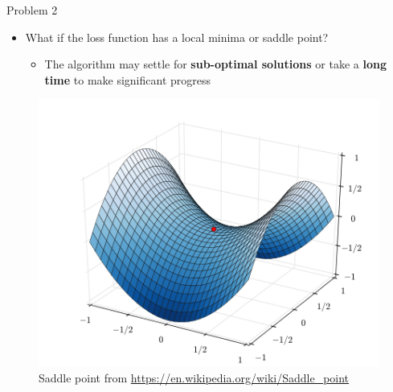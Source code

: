 \documentclass[serif, aspectratio=169]{beamer}
\begin{document}
\begin{frame}{Problem 2}
    \begin{minipage}{0.4\textwidth}
        \begin{itemize}
        \item What if the loss function has a local minima or saddle point?
        \begin{itemize}
            \item The algorithm may settle for \textbf{sub-optimal solutions} or take a \textbf{long time} to make significant progress
        \end{itemize}
        \end{itemize}
    \end{minipage}%
    \begin{minipage}{0.6\textwidth}
        \centering
        \begin{center}
        \begin{figure}
        \centering
            \includegraphics[width=0.75\linewidth]{pic/saddle_wiki.png}
            \caption{\footnotesize Saddle point from \url{https://en.wikipedia.org/wiki/Saddle_point}}
        \end{figure}
        \end{center}
    \end{minipage}
\end{frame}
\end{document}
